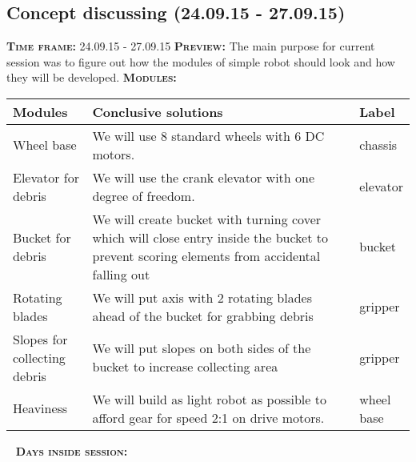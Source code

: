 \subsection{Concept discussing (24.09.15 - 27.09.15)}
	\textsc{\textbf{Time frame:}} 24.09.15 - 27.09.15 \newline
	\textsc{\textbf{Preview:}} The main purpose for current session was to figure out how the modules of simple robot should look and how they will be developed.\newline \newline
	\textsc{\textbf{Modules:}}
	
	\begin{table}[H]
		\vspace{-2mm}
		\begin{center}
			\begin{tabular}{|p{0.2\linewidth}|p{0.7\linewidth}|p{0.1\linewidth}|}
				\hline
				Modules & Conclusive solutions & Label \\
				\hline
				Wheel base & We will use 8 standard wheels with 6 DC motors. & chassis \\
				\hline
				Elevator for debris & We will use the crank elevator with one degree of freedom. & elevator \\
				\hline
				Bucket for debris & We will create bucket with turning cover which will close entry inside the bucket to prevent scoring elements from accidental falling out & bucket \\
				\hline
				Rotating blades & We will put axis with 2 rotating blades ahead of the bucket for grabbing debris & gripper \\
				\hline
				Slopes for collecting debris & We will put slopes on both sides of the bucket to increase collecting area & gripper \\
				\hline
				Heaviness & We will build as light robot as possible to afford gear for speed 2:1 on drive motors. & wheel base \\
				\hline
			\end{tabular}
		\end{center}
	\end{table}
	
  
   \newline
  \textsc{\textbf{Days inside session:}}
  
  
